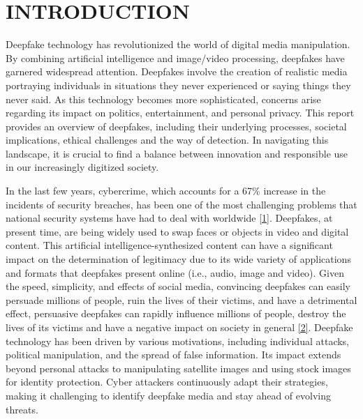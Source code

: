 

\section{INTRODUCTION}
Deepfake technology has revolutionized the world of digital media manipulation. By combining artificial intelligence and image/video processing, deepfakes have garnered widespread attention. Deepfakes involve the creation of realistic media portraying individuals in situations they never experienced or saying things they never said. As this technology becomes more sophisticated, concerns arise regarding its impact on politics, entertainment, and personal privacy. This report provides an overview of deepfakes, including their underlying processes, societal implications, ethical challenges and the way of detection. In navigating this landscape, it is crucial to find a balance between innovation and responsible use in our increasingly digitized society.

\noindent In the last few years, cybercrime, which accounts for a 67\% increase in the incidents of security breaches, has been one of the most challenging problems that national security systems have had to deal with worldwide \hyperref[ref1]{[1]}.
Deepfakes, at present time, are being widely used to swap faces or objects in video and digital content. This artificial intelligence-synthesized
content can have a significant impact on the determination of legitimacy due to its wide variety of applications and formats that deepfakes present online (i.e., audio, image and video).
Given the speed, simplicity, and effects of social media, convincing deepfakes can easily persuade millions of people, ruin the lives of their victims, and have a detrimental effect, persuasive deepfakes can rapidly influence millions of people, destroy the lives of its victims and have a negative impact on society in general \hyperref[ref2]{[2]}.
Deepfake technology has been driven by various motivations, including individual attacks, political manipulation, and the spread of false information. Its impact extends beyond personal attacks to manipulating satellite images and using stock images for identity protection. Cyber attackers continuously adapt their strategies, making it challenging to identify deepfake media and stay ahead of evolving threats.

